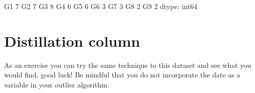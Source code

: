 \documentclass[letterpaper,10pt,english]{jupyterBook}
\begin{document}
\begin{sphinxVerbatim}[commandchars=\\\{\}]
G1    7
G2    7
G3    8
G4    6
G5    6
G6    3
G7    3
G8    2
G9    2
dtype: int64
\end{sphinxVerbatim}


\section{Distillation column}
\label{\detokenize{c2_data_preparation/outliers:distillation-column}}
\sphinxAtStartPar
As an exercise you can try the same technique to this dataset and see what you would find, good luck!
Be mindful that you do not incorporate the date as a variable in your outlier algorithm.

\begin{sphinxVerbatim}[commandchars=\\\{\}]
  
\end{sphinxVerbatim}
\end{document}
